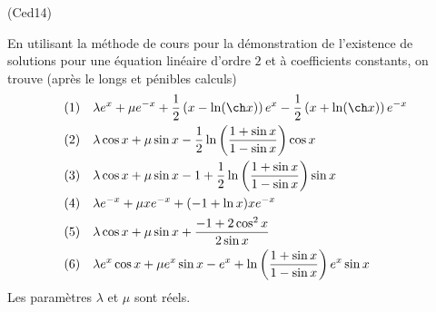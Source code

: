 \begin{tiny}(Ced14)\end{tiny}
En utilisant la méthode de cours pour la démonstration de l'existence de solutions pour une équation linéaire d'ordre $2$ et à coefficients constants, on trouve (après le longs et pénibles calculs)
\begin{align*}
&(1)& &\lambda e^x + \mu e^{-x} + \frac{1}{2}\left(x - \ln(\ch x) \right)e^{x}
   -\frac{1}{2}\left(x + \ln(\ch x) \right)e^{-x}\\ 
&(2)& &\lambda \cos x + \mu \sin x -\frac{1}{2}\ln\left( \frac{1+\sin x}{1-\sin x}\right) \cos x \\ 
&(3)& &\lambda \cos x + \mu \sin x -1 + \frac{1}{2}\ln\left( \frac{1+\sin x}{1-\sin x}\right) \sin x \\
&(4)& &\lambda e^{-x} + \mu xe^{-x} + (-1+\ln x)xe^{-x} \\
&(5)& &\lambda \cos x + \mu \sin x +\frac{-1+2\cos^2x}{2\sin x} \\
&(6)& & \lambda e^x\cos x + \mu e^x\sin x -e^{x} +\ln\left( \frac{1+\sin x}{1-\sin x}\right)e^x \sin x 
\end{align*}
Les paramètres $\lambda$ et $\mu$ sont réels.